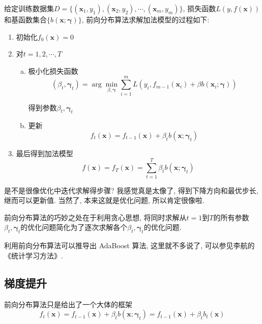\documentclass[a4paper,UTF8]{ctexart}
\theoremstyle{plain} \newtheorem{theorem}{定理}[section]
\theoremstyle{plain} \newtheorem{definition}{定义}[section]
\theoremstyle{plain} \newtheorem{lemma}{引理}[section]
\theoremstyle{plain} \newtheorem{proposition}{命题}[section]
\theoremstyle{plain} \newtheorem{example}{例}[section]
\theoremstyle{plain} \newtheorem{remark}{注}[section]
\theoremstyle{plain} \newtheorem{corollary}{推论}[section]
\begin{document}
给定训练数据集$D = \{(\bm{x}_1, y_1), (\bm{x}_2, y_2), \cdots, (\bm{x}_{m}, y_m)\}$, 损失函数$L(y, f(\bm{x}))$和基函数集合$\{b(\bm{x}; \bm{\gamma})\}$, 前向分布算法求解加法模型的过程如下:
\begin{enumerate}[(1)]
\item 初始化$f_{0}(\bm{x}) = 0$

\item 对$t = 1, 2, \cdots, T$
\begin{enumerate}[(a)]
\item 极小化损失函数
\begin{equation*}
(\beta_{t}, \bm{\gamma}_{t}) = \arg \min_{\beta, \bm{\gamma}} \sum_{i=1}^{m} L(y_i, f_{m-1}(\bm{x}_i) + \beta b(\bm{x}_i; \bm{\gamma}))
\end{equation*}

得到参数$\beta_{t}, \bm{\gamma}_{t}$

\item 更新
\begin{equation*}
f_{t}(\bm{x}) = f_{t-1}(\bm{x}) + \beta_{t} b(\bm{x}; \bm{\gamma}_{t})
\end{equation*}

\end{enumerate}

\item 最后得到加法模型
\begin{equation*}
f(\bm{x}) = f_{T}(\bm{x}) = \sum_{t=1}^{T} \beta_{t} b(\bm{x}; \bm{\gamma}_{t})
\end{equation*}

\end{enumerate}

是不是很像优化中迭代求解得步骤? 我感觉真是太像了, 得到下降方向和最优步长, 继而可以更新值. 当然了, 本来这就是优化问题, 所以肯定很像啦.

前向分布算法的巧妙之处在于利用贪心思想, 将同时求解从$t=1$到$T$的所有参数$\beta_{t}, \bm{\gamma}_{t}$的优化问题简化为了逐次求解各个$\beta_{t}, \bm{\gamma}_{t}$的优化问题.

利用前向分布算法可以推导出 AdaBoost 算法, 这里就不多说了, 可以参见李航的《统计学习方法》.


\subsection{梯度提升}
前向分布算法只是给出了一个大体的框架
\begin{equation*}
f_{t}(\bm{x}) = f_{t-1}(\bm{x}) + \beta_{t} b(\bm{x}; \bm{\gamma}_{t}) = f_{t-1}(\bm{x}) + \beta_{t} b_{t}(\bm{x})
\end{equation*}
\end{document}
